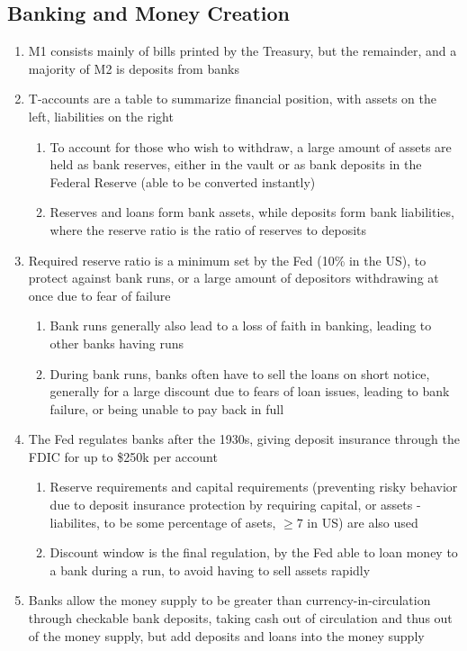 \subsection{Banking and Money Creation}
\begin{enumerate}
\item M1 consists mainly of bills printed by the Treasury, but the remainder, and a majority of M2 is deposits from banks
\item T-accounts are a table to summarize financial position, with assets on the left, liabilities on the right
\begin{enumerate}
\item To account for those who wish to withdraw, a large amount of assets are held as bank reserves, either in the vault or as bank deposits in the Federal Reserve (able to be converted instantly)
\item Reserves and loans form bank assets, while deposits form bank liabilities, where the reserve ratio is the ratio of reserves to deposits
\end{enumerate}
\item Required reserve ratio is a minimum set by the Fed (10\% in the US), to protect against bank runs, or a large amount of depositors withdrawing at once due to fear of failure
\begin{enumerate}
\item Bank runs generally also lead to a loss of faith in banking, leading to other banks having runs
\item During bank runs, banks often have to sell the loans on short notice, generally for a large discount due to fears of loan issues, leading to bank failure, or being unable to pay back in full
\end{enumerate}
\item The Fed regulates banks after the 1930s, giving deposit insurance through the FDIC for up to \$250k per account
\begin{enumerate}
\item Reserve requirements and capital requirements (preventing risky behavior due to deposit insurance protection by requiring capital, or assets - liabilites, to be some percentage of asets, $\geq 7$ in US) are also used
\item Discount window is the final regulation, by the Fed able to loan money to a bank during a run, to avoid having to sell assets rapidly
\end{enumerate}
\item Banks allow the money supply to be greater than currency-in-circulation through checkable bank deposits, taking cash out of circulation and thus out of the money supply, but add deposits and loans into the money supply

\end{enumerate}
